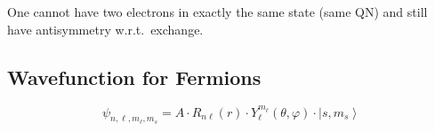 \newpar{}

One cannot have two electrons in exactly the same state (same QN) and still have antisymmetry w.r.t.\ exchange.

\subsection{Wavefunction for Fermions}
\noindent\begin{equation*}
    \psi_{n,\ell,m_\ell,m_s} = A\cdot R_{n\ell}(r)\cdot Y_\ell^{m_\ell}(\theta, \varphi) \cdot \left|s,m_s \right\rangle
\end{equation*}
